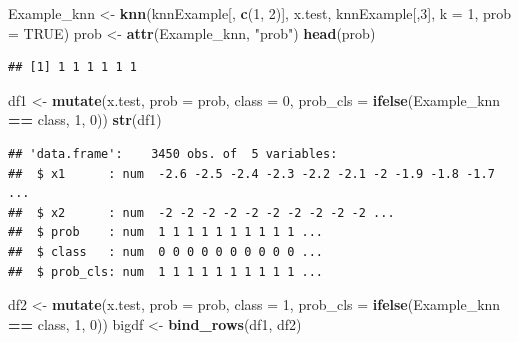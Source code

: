 \documentclass[]{article}
\newenvironment{Shaded}{\begin{snugshade}}{\end{snugshade}}
\newcommand{\KeywordTok}[1]{\textcolor[rgb]{0.13,0.29,0.53}{\textbf{#1}}}
\newcommand{\DataTypeTok}[1]{\textcolor[rgb]{0.13,0.29,0.53}{#1}}
\newcommand{\DecValTok}[1]{\textcolor[rgb]{0.00,0.00,0.81}{#1}}
\newcommand{\StringTok}[1]{\textcolor[rgb]{0.31,0.60,0.02}{#1}}
\newcommand{\OtherTok}[1]{\textcolor[rgb]{0.56,0.35,0.01}{#1}}
\newcommand{\OperatorTok}[1]{\textcolor[rgb]{0.81,0.36,0.00}{\textbf{#1}}}
\newcommand{\NormalTok}[1]{#1}
\begin{document}
\begin{Shaded}
\begin{Highlighting}[]
\NormalTok{Example_knn <-}\StringTok{ }\KeywordTok{knn}\NormalTok{(knnExample[, }\KeywordTok{c}\NormalTok{(}\DecValTok{1}\NormalTok{, }\DecValTok{2}\NormalTok{)], x.test, knnExample[,}\DecValTok{3}\NormalTok{], }\DataTypeTok{k =} \DecValTok{1}\NormalTok{, }\DataTypeTok{prob =} \OtherTok{TRUE}\NormalTok{) }
\NormalTok{prob <-}\StringTok{ }\KeywordTok{attr}\NormalTok{(Example_knn, }\StringTok{"prob"}\NormalTok{)}
\KeywordTok{head}\NormalTok{(prob)}
\end{Highlighting}
\end{Shaded}

\begin{verbatim}
## [1] 1 1 1 1 1 1
\end{verbatim}

\begin{Shaded}
\begin{Highlighting}[]
\NormalTok{df1 <-}\StringTok{ }\KeywordTok{mutate}\NormalTok{(x.test, }\DataTypeTok{prob =}\NormalTok{ prob, }\DataTypeTok{class =} \DecValTok{0}\NormalTok{, }\DataTypeTok{prob_cls =} \KeywordTok{ifelse}\NormalTok{(Example_knn }\OperatorTok{==}\StringTok{ }\NormalTok{class, }\DecValTok{1}\NormalTok{, }\DecValTok{0}\NormalTok{))}
\KeywordTok{str}\NormalTok{(df1)}
\end{Highlighting}
\end{Shaded}

\begin{verbatim}
## 'data.frame':    3450 obs. of  5 variables:
##  $ x1      : num  -2.6 -2.5 -2.4 -2.3 -2.2 -2.1 -2 -1.9 -1.8 -1.7 ...
##  $ x2      : num  -2 -2 -2 -2 -2 -2 -2 -2 -2 -2 ...
##  $ prob    : num  1 1 1 1 1 1 1 1 1 1 ...
##  $ class   : num  0 0 0 0 0 0 0 0 0 0 ...
##  $ prob_cls: num  1 1 1 1 1 1 1 1 1 1 ...
\end{verbatim}

\begin{Shaded}
\begin{Highlighting}[]
\NormalTok{df2 <-}\StringTok{ }\KeywordTok{mutate}\NormalTok{(x.test, }\DataTypeTok{prob =}\NormalTok{ prob, }\DataTypeTok{class =} \DecValTok{1}\NormalTok{, }\DataTypeTok{prob_cls =} \KeywordTok{ifelse}\NormalTok{(Example_knn }\OperatorTok{==}\StringTok{ }\NormalTok{class, }\DecValTok{1}\NormalTok{, }\DecValTok{0}\NormalTok{))}
\NormalTok{bigdf <-}\StringTok{ }\KeywordTok{bind_rows}\NormalTok{(df1, df2)}
\end{Highlighting}
\end{Shaded}
\end{document}
